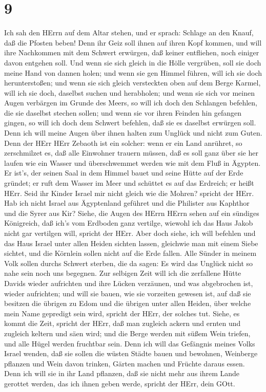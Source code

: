\hypertarget{section-8}{%
\section{9}\label{section-8}}

 Ich sah den HErrn auf dem Altar stehen, und er sprach:
Schlage an den Knauf, daß die Pfosten beben! Denn ihr Geiz soll ihnen
auf ihren Kopf kommen, und will ihre Nachkommen mit dem Schwert
erwürgen, daß keiner entfliehen, noch einiger davon entgehen soll.
 Und wenn sie sich gleich in die Hölle vergrüben, soll sie
doch meine Hand von dannen holen; und wenn sie gen Himmel führen, will
ich sie doch herunterstoßen;  und wenn sie sich gleich
versteckten oben auf dem Berge Karmel, will ich sie doch, daselbst
suchen und herabholen; und wenn sie sich vor meinen Augen verbärgen im
Grunde des Meers, so will ich doch den Schlangen befehlen, die sie
daselbst stechen sollen;  und wenn sie vor ihren Feinden hin
gefangen gingen, so will ich doch dem Schwert befehlen, daß sie es
daselbst erwürgen soll. Denn ich will meine Augen über ihnen halten zum
Unglück und nicht zum Guten.  Denn der HErr HErr Zebaoth ist
ein solcher: wenn er ein Land anrühret, so zerschmilzet es, daß alle
Einwohner trauern müssen, daß es soll ganz über sie her laufen wie ein
Wasser und überschwemmet werden wie mit dem Fluß in Ägypten.
 Er ist's, der seinen Saal in dem Himmel bauet und seine
Hütte auf der Erde gründet; er ruft dem Wasser im Meer und schüttet es
auf das Erdreich; er heißt HErr.  Seid ihr Kinder Israel mir
nicht gleich wie die Mohren? spricht der HErr. Hab ich nicht Israel aus
Ägyptenland geführet und die Philister aus Kaphthor und die Syrer aus
Kir?  Siehe, die Augen des HErrn HErrn sehen auf ein
sündiges Königreich, daß ich's vom Erdboden ganz vertilge, wiewohl ich
das Haus Jakob nicht gar vertilgen will, spricht der HErr. 
Aber doch siehe, ich will befehlen und das Haus Israel unter allen
Heiden sichten lassen, gleichwie man mit einem Siebe sichtet, und die
Körnlein sollen nicht auf die Erde fallen.  Alle Sünder in
meinem Volk sollen durchs Schwert sterben, die da sagen: Es wird das
Unglück nicht so nahe sein noch uns begegnen.  Zur selbigen
Zeit will ich die zerfallene Hütte Davids wieder aufrichten und ihre
Lücken verzäunen, und was abgebrochen ist, wieder aufrichten; und will
sie bauen, wie sie vorzeiten gewesen ist,  auf daß sie
besitzen die übrigen zu Edom und die übrigen unter allen Heiden, über
welche mein Name gepredigt sein wird, spricht der HErr, der solches tut.
 Siehe, es kommt die Zeit, spricht der HErr, daß man
zugleich ackern und ernten und zugleich keltern und säen wird; und die
Berge werden mit süßem Wein triefen, und alle Hügel werden fruchtbar
sein.  Denn ich will das Gefängnis meines Volks Israel
wenden, daß sie sollen die wüsten Städte bauen und bewohnen, Weinberge
pflanzen und Wein davon trinken, Gärten machen und Früchte daraus essen.
 Denn ich will sie in ihr Land pflanzen, daß sie nicht mehr
aus ihrem Lande gerottet werden, das ich ihnen geben werde, spricht der
HErr, dein GOtt.
